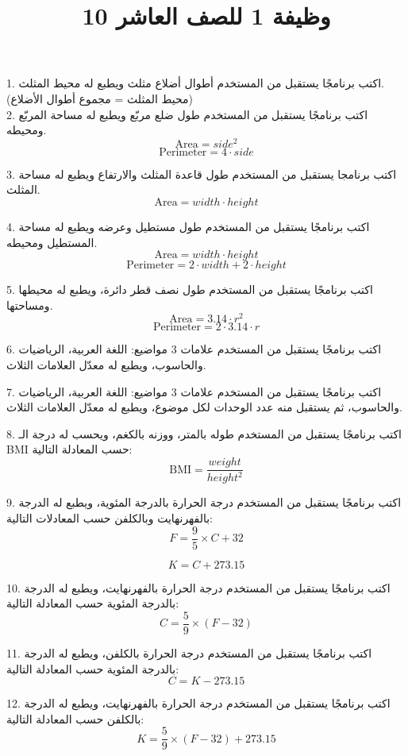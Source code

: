 \documentclass[12pt]{article}
\title{وظيفة 1 للصف العاشر 10}
\begin{document}
\maketitle
\thispagestyle{fancy}

1. اكتب برنامجًا يستقبل من المستخدم أطوال أضلاع مثلث ويطبع له محيط المثلث. \\
(محيط المثلث = مجموع أطوال الأضلاع) \\

2. اكتب برنامجًا يستقبل من المستخدم طول ضلع مربّع ويطبع له مساحة المربّع ومحيطه.
\[
    \text{Area} = side ^ 2
\]
\[
    \text{Perimeter} = 4 \cdot side
\]

3. اكتب برنامجا يستقبل من المستخدم طول قاعدة المثلث والارتفاع ويطبع له مساحة المثلث.
\[
    \text{Area} = width \cdot height
\]


4. اكتب برنامجًا يستقبل من المستخدم طول مستطيل وعرضه ويطبع له مساحة المستطيل ومحيطه.
\[
    \text{Area} = width \cdot height
\]
\[
    \text{Perimeter} = 2 \cdot width + 2 \cdot height
\]

5. اكتب برنامجًا يستقبل من المستخدم طول نصف قطر دائرة، ويطبع له محيطها ومساحتها.
\[
\text{Area} = 3.14 \cdot r^2
\]
\[
    \text{Perimeter} = 2 \cdot 3.14 \cdot r
\]

6. اكتب برنامجًا يستقبل من المستخدم علامات 3 مواضيع: اللغة العربية، الرياضيات والحاسوب، ويطبع له معدّل العلامات الثلاث.

7. اكتب برنامجًا يستقبل من المستخدم علامات 3 مواضيع: اللغة العربية، الرياضيات والحاسوب، ثم يستقبل منه عدد الوحدات لكل موضوع، ويطبع له معدّل العلامات الثلاث.

8. اكتب برنامجًا يستقبل من المستخدم طوله بالمتر، ووزنه بالكغم، ويحسب له درجة الـ BMI حسب المعادلة التالية:
\[
\text{BMI} = \frac{weight}{height^2}
\]

9. اكتب برنامجًا يستقبل من المستخدم درجة الحرارة بالدرجة المئوية، ويطبع له الدرجة بالفهرنهايت وبالكلفن حسب المعادلات التالية:
\[
    F = \frac{9}{5} \times C + 32
\]

\[
K = C + 273.15
\]

10. اكتب برنامجًا يستقبل من المستخدم درجة الحرارة بالفهرنهايت، ويطبع له الدرجة بالدرجة المئوية حسب المعادلة التالية:
\[
C = \frac{5}{9} \times (F - 32)
\]

11. اكتب برنامجًا يستقبل من المستخدم درجة الحرارة بالكلفن، ويطبع له الدرجة بالدرجة المئوية حسب المعادلة التالية:
\[
C = K - 273.15
\]

12. اكتب برنامجًا يستقبل من المستخدم درجة الحرارة بالفهرنهايت، ويطبع له الدرجة بالكلفن حسب المعادلة التالية:
\[
K = \frac{5}{9} \times (F - 32) + 273.15
\]
\end{document}
